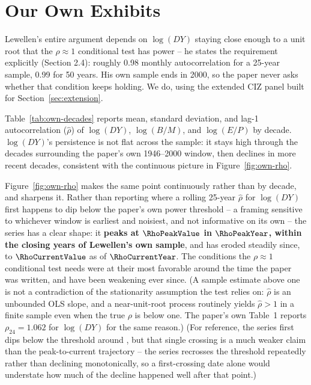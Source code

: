 \documentclass[11pt]{article}
\newcommand{\PathToOutput}{../_output}
\begin{document}
\section{Our Own Exhibits}
\label{sec:exhibits}

Lewellen's entire argument depends on \(\log(DY)\) staying close enough to a
unit root that the \(\rho \approx 1\) conditional test has power -- he
states the requirement explicitly (Section 2.4): roughly 0.98 monthly
autocorrelation for a 25-year sample, 0.99 for 50 years. His own sample
ends in 2000, so the paper never asks whether that condition keeps holding.
We do, using the extended CIZ panel built for
Section~\ref{sec:extension}.

Table~\ref{tab:own-decades} reports mean, standard deviation, and lag-1
autocorrelation (\(\hat\rho\)) of \(\log(DY)\), \(\log(B/M)\), and
\(\log(E/P)\) by decade. \(\log(DY)\)'s persistence is not flat across the
sample: it stays high through the decades surrounding the paper's own
1946--2000 window, then declines in more recent decades, consistent with
the continuous picture in Figure~\ref{fig:own-rho}.

\begin{table}[H]
\centering
\resizebox{\textwidth}{!}{%
%
}
\caption{Mean, standard deviation, and lag-1 autocorrelation of
\(\log(DY)\), \(\log(B/M)\), and \(\log(E/P)\) by decade, 1946--2025 (CIZ
panel). The takeaway is in the \(\hat\rho\) columns, not the levels: \(\log(DY)\)'s autocorrelation declines in recent decades while \(\log(B/M)\)
and \(\log(E/P)\) remain comparatively stable.}
\label{tab:own-decades}
\end{table}

Figure~\ref{fig:own-rho} makes the same point continuously rather than by
decade, and sharpens it. Rather than reporting where a rolling 25-year
\(\hat\rho\) for \(\log(DY)\) first happens to dip below the paper's own
power threshold -- a framing sensitive to whichever window is earliest and
noisiest, and not informative on its own -- the series has a clear shape:
it \textbf{peaks at \(\RhoPeakValue\) in \(\RhoPeakYear\), within the
closing years of Lewellen's own sample}, and has eroded steadily since,
to \(\RhoCurrentValue\) as of \(\RhoCurrentYear\). The conditions the
\(\rho \approx 1\) conditional test needs were at their most favorable
around the time the paper was written, and have been weakening ever since.
(A sample estimate above one is not a contradiction of the stationarity
assumption the test relies on: \(\hat\rho\) is an unbounded OLS slope, and
a near-unit-root process routinely yields \(\hat\rho > 1\) in a finite
sample even when the true \(\rho\) is below one. The paper's own Table~1
reports \(\rho_{24} = 1.062\) for \(\log(DY)\) for the same reason.)
(For reference, the series first dips below the \RhoThreshold{} threshold
around \RhoFirstCrossYear{}, but that single crossing is a much weaker
claim than the peak-to-current trajectory -- the series recrosses the
threshold repeatedly rather than declining monotonically, so a first-crossing
date alone would understate how much of the decline happened well after
that point.)
\end{document}
